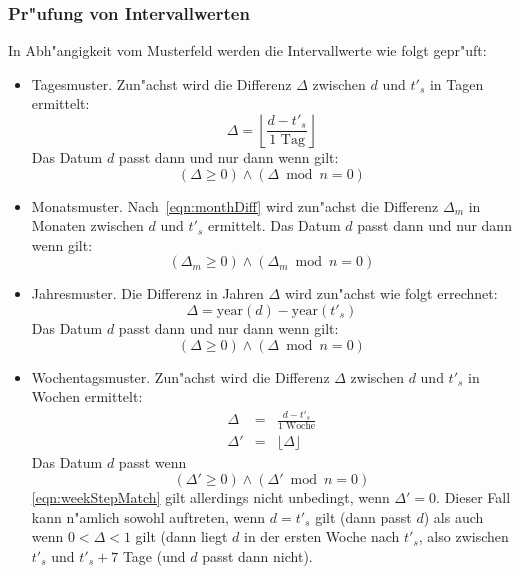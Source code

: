 \documentclass[a4paper]{article}
\newcommand*{\yearf}{\mathrm{year}}
\numberwithin{equation}{section}
\begin{document}
\subsubsection{Pr"ufung von Intervallwerten}
In Abh"angigkeit vom Musterfeld werden die Intervallwerte wie folgt gepr"uft:
\begin{itemize}
\item Tagesmuster. Zun"achst wird die Differenz $\Delta$ zwischen $d$ und $t'_s$
  in Tagen ermittelt:
  \begin{equation}
    \Delta = \left\lfloor\frac{d - t'_s}{1 \textrm{ Tag}}\right\rfloor
  \end{equation}
  Das Datum $d$ passt dann und nur dann wenn gilt:
  \begin{equation}(\Delta \ge 0) \wedge (\Delta \bmod n = 0)\end{equation}
\item Monatsmuster. Nach~\eqref{eqn:monthDiff} wird zun"achst die Differenz
  $\Delta_m$ in Monaten zwischen $d$ und $t'_s$ ermittelt. Das Datum $d$ passt
  dann und nur dann wenn gilt:
  \begin{equation}(\Delta_m \ge 0) \wedge (\Delta_m \bmod n = 0)\end{equation}
\item Jahresmuster. Die Differenz in Jahren $\Delta$ wird zun"achst wie folgt
  errechnet:
  \begin{equation}\Delta = \yearf(d) - \yearf(t'_s)\end{equation}
  Das Datum $d$ passt dann und nur dann wenn gilt:
  \begin{equation}(\Delta \ge 0) \wedge (\Delta \bmod n = 0)\end{equation}
\item Wochentagsmuster. Zun"achst wird die Differenz $\Delta$ zwischen $d$ und
  $t'_s$ in Wochen ermittelt:
  \begin{eqnarray}
    \Delta & = & \frac{d - t'_s}{1 \textrm{ Woche}} \\
    \Delta' & = & \lfloor\Delta\rfloor
  \end{eqnarray}
  Das Datum $d$ passt wenn
  \begin{equation}\label{eqn:weekStepMatch}
    (\Delta' \ge 0) \wedge (\Delta' \bmod n = 0)
  \end{equation}
  \eqref{eqn:weekStepMatch} gilt allerdings nicht unbedingt, wenn $\Delta' = 0$.
  Dieser Fall kann n"amlich sowohl auftreten, wenn $d = t'_s$ gilt (dann passt
  $d$) als auch wenn $0 < \Delta < 1$ gilt (dann liegt $d$ in der ersten Woche
  nach $t'_s$, also zwischen $t'_s$ und $t'_s + 7$ Tage (und $d$ passt dann
  nicht).
\end{itemize}
\end{document}
